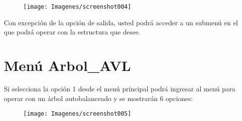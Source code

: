 \documentclass[letterpaper, 11pt]{article}
\begin{document}
	\begin{figure}[H]
		\centering
		\texttt{[image: Imagenes/screenshot004]}
	\end{figure}
	
	Con excepción de la opción de salida, usted podrá acceder a un submenú en el que podrá operar con la estructura que desee.
	
	\newpage
	
	\section*{Menú Arbol\_AVL}
	
	Si selecciona la opción 1 desde el menú principal podrá ingresar al menú para operar con un árbol autobalanceado y se mostrarán 6 opciones:
	
	\begin{figure}[H]
		\centering
		\texttt{[image: Imagenes/screenshot005]}
	\end{figure}
	
\end{document}
